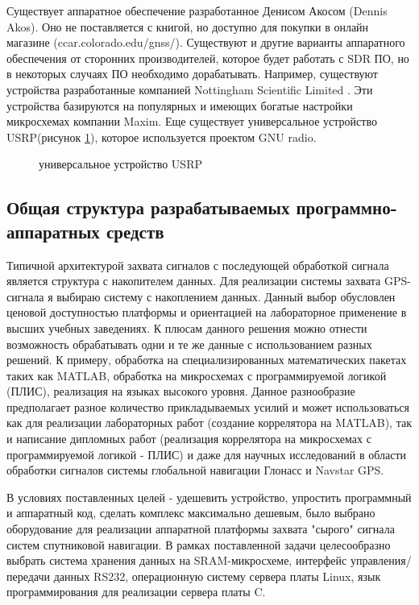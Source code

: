 Существует аппаратное обеспечение разработанное Денисом Акосом (Dennis Akos). Оно не поставляется с книгой, но 
доступно для покупки в онлайн магазине (ccar.colorado.edu/gnss/). Существуют и другие варианты аппаратного обеспечения от сторонних
производителей, которое будет работать с SDR ПО, но в некоторых случаях ПО необходимо дорабатывать. Например, существуют устройства
разработанные компанией Nottingham Scientific Limited \cite{soft_gps1}. Эти устройства базируются на популярных и
имеющих богатые настройки микросхемах компании Maxim. Еще существует универсальное устройство USRP(рисунок \ref{pic:usrp}),
которое используется проектом GNU radio.

\begin{figure}[H]
\begin{center}
\end{center}
\caption{универсальное устройство USRP}
\label{pic:usrp}
\end{figure}

\subsection{Общая структура разрабатываемых программно-аппаратных средств}
\label{razdel13}
Типичной архитектурой захвата сигналов с последующей обработкой сигнала является структура с накопителем данных.
Для реализации системы захвата GPS-сигнала я выбираю систему с накоплением данных. Данный выбор обусловлен
ценовой доступностью платформы и ориентацией на лабораторное применение в высших учебных заведениях.
К плюсам данного решения можно отнести возможность обрабатывать одни и те же данные с использованием разных решений.
К примеру, обработка на специализированных математических пакетах таких как MATLAB, обработка на микросхемах с
программируемой логикой (ПЛИС), реализация на языках высокого уровня. Данное разнообразие предполагает разное
количество прикладываемых усилий и может использоваться как для реализации лабораторных работ (создание
коррелятора на MATLAB), так и написание дипломных работ (реализация коррелятора на микросхемах с программируемой
логикой - ПЛИС) и даже для научных исследований в области обработки сигналов системы глобальной навигации
Глонасс и Navstar GPS.

В условиях поставленных целей - удешевить устройство, упростить программный и аппаратный код, сделать
комплекс максимально дешевым, было выбрано оборудование для реализации аппаратной платформы захвата "сырого"
сигнала систем спутниковой навигации. В рамках поставленной задачи целесообразно выбрать система хранения данных
на SRAM-микросхеме, интерфейс управления/передачи данных RS232, операционную систему
сервера платы Linux, язык программирования для реализации сервера платы C.

